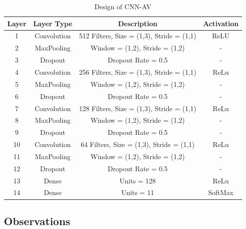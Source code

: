 \documentclass[journal,onecolumn]{IEEEtran}
\begin{document}
\begin{table}
\centering
\caption{Design of CNN-AV}
\label{tab:my-table}
\begin{tabular}{@{}cccc@{}}
\toprule
Layer & Layer Type  & Description                               & Activation \\ \midrule
1     & Convolution & 512 Filters, Size = (1,3), Stride = (1,1) & ReLU       \\
2     & MaxPooling  & Window = (1,2), Stride = (1,2)            & -          \\
3     & Dropout     & Dropout Rate = 0.5                        & -          \\
4     & Convolution & 256 Filters, Size = (1,3), Stride = (1,1) & ReLu       \\
5     & MaxPooling  & Window = (1,2), Stride = (1,2)            & -          \\
6     & Dropout     & Dropout Rate = 0.5                        & -          \\
7     & Convolution & 128 Filters, Size = (1,3), Stride = (1,1) & ReLu       \\
8     & MaxPooling  & Window = (1,2), Stride = (1,2)            & -          \\
9     & Dropout     & Dropout Rate = 0.5                        & -          \\
10    & Convolution & 64 Filters, Size = (1,3), Stride = (1,1)  & ReLu       \\
11    & MaxPooling  & Window = (1,2), Stride = (1,2)            & -          \\
12    & Dropout     & Dropout Rate = 0.5                        & -          \\
13    & Dense       & Units = 128                               & ReLu       \\
14    & Dense       & Units = 11                                & SoftMax    \\ \bottomrule
\end{tabular}
\end{table}

\subsection{Observations}
\end{document}
